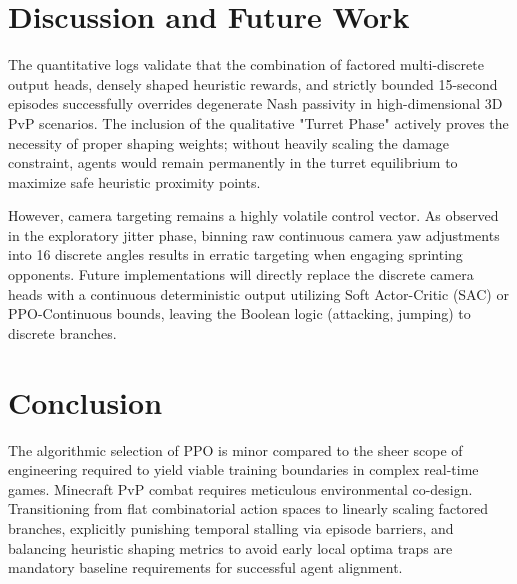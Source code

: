 \documentclass[conference]{IEEEtran}
\begin{document}
\section{Discussion and Future Work}
The quantitative logs validate that the combination of factored multi-discrete output heads, densely shaped heuristic rewards, and strictly bounded 15-second episodes successfully overrides degenerate Nash passivity in high-dimensional 3D PvP scenarios. The inclusion of the qualitative "Turret Phase" actively proves the necessity of proper shaping weights; without heavily scaling the damage constraint, agents would remain permanently in the turret equilibrium to maximize safe heuristic proximity points.

However, camera targeting remains a highly volatile control vector. As observed in the exploratory jitter phase, binning raw continuous camera yaw adjustments into 16 discrete angles results in erratic targeting when engaging sprinting opponents. Future implementations will directly replace the discrete camera heads with a continuous deterministic output utilizing Soft Actor-Critic (SAC) or PPO-Continuous bounds, leaving the Boolean logic (attacking, jumping) to discrete branches.

\section{Conclusion}
The algorithmic selection of PPO is minor compared to the sheer scope of engineering required to yield viable training boundaries in complex real-time games. Minecraft PvP combat requires meticulous environmental co-design. Transitioning from flat combinatorial action spaces to linearly scaling factored branches, explicitly punishing temporal stalling via episode barriers, and balancing heuristic shaping metrics to avoid early local optima traps are mandatory baseline requirements for successful agent alignment.
\end{document}
